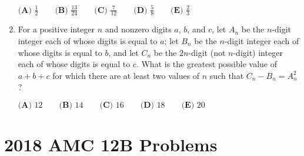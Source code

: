 \documentclass{article}
\begin{document}
\begin{enumerate}[label=\arabic*., itemsep=0.5em]
\(
\textbf{(A) }\frac{1}{2}\qquad
\textbf{(B) }\frac{13}{24} \qquad
\textbf{(C) }\frac{7}{12} \qquad
\textbf{(D) }\frac{5}{8} \qquad
\textbf{(E) }\frac{2}{3}\qquad
\)\par \vspace{0.5em}\item For a positive integer \(n\) and nonzero digits \(a\), \(b\), and \(c\), let \(A_n\) be the \(n\)-digit integer each of whose digits is equal to \(a\); let \(B_n\) be the \(n\)-digit integer each of whose digits is equal to \(b\), and let \(C_n\) be the \(2n\)-digit (not \(n\)-digit) integer each of whose digits is equal to \(c\). What is the greatest possible value of \(a + b + c\) for which there are at least two values of \(n\) such that \(C_n - B_n = A_n^2\)?

\(\textbf{(A) } 12 \qquad \textbf{(B) } 14 \qquad \textbf{(C) } 16 \qquad \textbf{(D) } 18 \qquad \textbf{(E) } 20\)\par \vspace{0.5em}\end{enumerate}\newpage\section*{2018 AMC 12B Problems}
\end{document}
